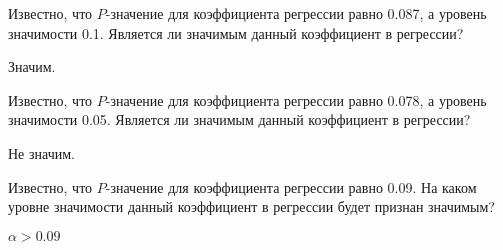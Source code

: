 \begin{problem} %
Известно, что $P$-значение для коэффициента регрессии равно 0.087, а уровень значимости 0.1. Является ли значимым данный коэффициент в регрессии?


\begin{sol}
Значим.
\end{sol}
\end{problem}



\begin{problem} %
Известно, что $P$-значение для коэффициента регрессии равно 0.078, а уровень значимости 0.05. Является ли значимым данный коэффициент в регрессии?


\begin{sol}
Не значим.
\end{sol}
\end{problem}



\begin{problem}
Известно, что $P$-значение для коэффициента регрессии равно 0.09. На каком
уровне значимости данный коэффициент в регрессии будет признан значимым?


\begin{sol}
$\alpha>0.09$
\end{sol}
\end{problem}



